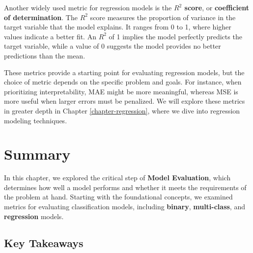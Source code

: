 \documentclass[
]{book}
\theoremstyle{definition}
\theoremstyle{definition}
\theoremstyle{definition}
\theoremstyle{definition}
\theoremstyle{remark}
\begin{document}
Another widely used metric for regression models is the \textbf{\(R^2\) score}, or \textbf{coefficient of determination}. The \(R^2\) score measures the proportion of variance in the target variable that the model explains. It ranges from 0 to 1, where higher values indicate a better fit. An \(R^2\) of 1 implies the model perfectly predicts the target variable, while a value of 0 suggests the model provides no better predictions than the mean.

These metrics provide a starting point for evaluating regression models, but the choice of metric depends on the specific problem and goals. For instance, when prioritizing interpretability, MAE might be more meaningful, whereas MSE is more useful when larger errors must be penalized. We will explore these metrics in greater depth in Chapter \ref{chapter-regression}, where we dive into regression modeling techniques.

\section{Summary}\label{summary-1}

In this chapter, we explored the critical step of \textbf{Model Evaluation}, which determines how well a model performs and whether it meets the requirements of the problem at hand. Starting with the foundational concepts, we examined metrics for evaluating classification models, including \textbf{binary}, \textbf{multi-class}, and \textbf{regression} models.

\subsection*{Key Takeaways}\label{key-takeaways}
\end{document}
